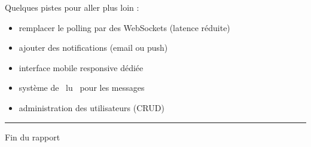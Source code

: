 \documentclass[12pt,a4paper]{article}
\begin{document}
Quelques pistes pour aller plus loin :
\begin{itemize}
    \item remplacer le polling par des WebSockets (latence r\'eduite)
    \item ajouter des notifications (email ou push)
    \item interface mobile responsive d\'edi\'ee
    \item syst\`eme de \guillemotleft~lu~\guillemotright{} pour les messages
    \item administration des utilisateurs (CRUD)
\end{itemize}

\vspace{1cm}
\begin{center}
\rule{0.4\textwidth}{0.3pt}\par
\small\sffamily\textcolor{comment}{Fin du rapport}
\end{center}
\end{document}
